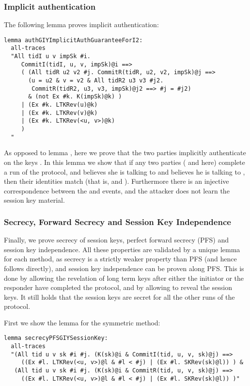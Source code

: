\spacehack
\subsubsection{Implicit authentication}

The following lemma proves implicit authentication:
\begin{lstlisting}
lemma authGIYImplicitAuthGuaranteeForI2:
  all-traces
  "All tidI u v impSk #i.
     CommitI(tidI, u, v, impSk)@i ==>
     ( (All tidR u2 v2 #j. CommitR(tidR, u2, v2, impSk)@j ==>
       (u = u2 & v = v2 & All tidR2 u3 v3 #j2.
	    CommitR(tidR2, u3, v3, impSk)@j2 ==> #j = #j2)
       & (not Ex #k. K(impSk)@k) )
     | (Ex #k. LTKRev(u)@k)
     | (Ex #k. LTKRev(v)@k)
     | (Ex #k. LTKRev(<u, v>)@k)
     )
  "
\end{lstlisting}

As opposed to lemma , here we prove that the two
parties implicitly authenticate on the keys . %
In this lemma we show that if any two parties ( and  here) complete
a run of the protocol, and  believes she is talking to  and 
believes he is talking to , then their identities match (that is,
 and ). Furthermore there is an injective correspondence
between the  and  events, and the attacker does not
learn the session key material.

\spacehack
\subsubsection{Secrecy, Forward Secrecy and Session Key Independence}

Finally, we prove secrecy of session keys, perfect forward secrecy
(PFS) and session key independence.
%
All these properties are validated by a unique lemma for each method,
as secrecy is a strictly weaker property than PFS (and hence follows
directly), and session key independence can be proven along PFS.
%
This is done by allowing the revelation of long term keys after either
the initiator or the responder have completed the protocol, and by
allowing to reveal the session keys.
%
It still holds that the session keys are secret for all the other runs
of the protocol.

First we show the lemma for the symmetric method:
\begin{lstlisting}
lemma secrecyPFSGIYSessionKey:
  all-traces
  "(All tid u v sk #i #j. (K(sk)@i & CommitI(tid, u, v, sk)@j) ==>
     ((Ex #l. LTKRev(<u, v>)@l & #l < #j) | (Ex #l. SKRev(sk)@l)) ) &
   (All tid u v sk #i #j. (K(sk)@i & CommitR(tid, u, v, sk)@j) ==>
     ((Ex #l. LTKRev(<u, v>)@l & #l < #j) | (Ex #l. SKRev(sk)@l)) )"
\end{lstlisting}

